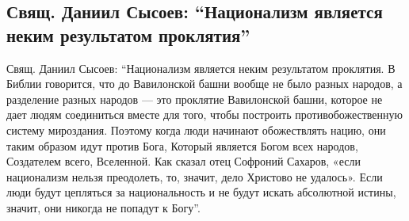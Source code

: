  
 
 

\subsection{Свящ. Даниил Сысоев: \enquote{Национализм является неким результатом проклятия}}

Свящ. Даниил Сысоев: \enquote{Национализм является неким результатом проклятия. В
Библии говорится, что до Вавилонской башни вообще не было разных народов, а
разделение разных народов — это проклятие Вавилонской башни, которое не дает
людям соединиться вместе для того, чтобы построить противобожественную систему
мироздания. Поэтому когда люди начинают обожествлять нацию, они таким образом
идут против Бога, Который является Богом всех народов, Создателем всего,
Вселенной. Как сказал отец Софроний Сахаров, «если национализм нельзя
преодолеть, то, значит, дело Христово не удалось». Если люди будут цепляться за
национальность и не будут искать абсолютной истины, значит, они никогда не
попадут к Богу}.
